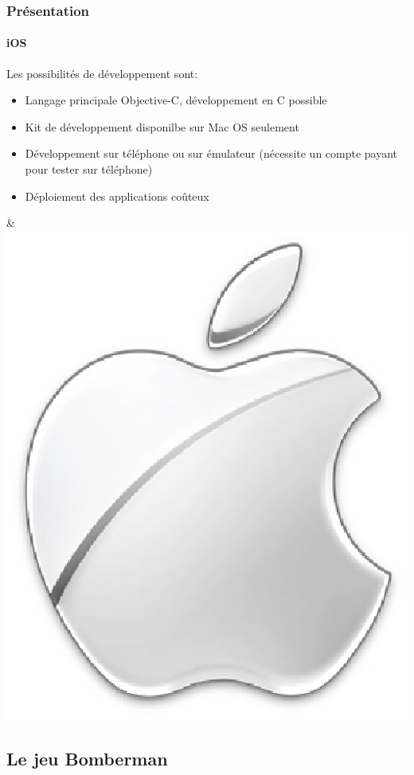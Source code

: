 \begin{frame}
\frametitle{Présentation}
\framesubtitle{iOS}
	\begin{minipage}{8cm}
	Les possibilités de développement sont: \\ 

	\begin{itemize}
		\item Langage principale Objective-C, développement en C possible
		\item Kit de développement disponilbe sur Mac OS seulement
		\item Développement sur téléphone ou sur émulateur (nécessite un compte payant pour tester sur téléphone)
		\item Déploiement des applications coûteux
	\end{itemize}
	\end{minipage} & \includegraphics[scale=0.2]{img/apple.eps} 
\end{frame}


\subsection{Le jeu Bomberman}


